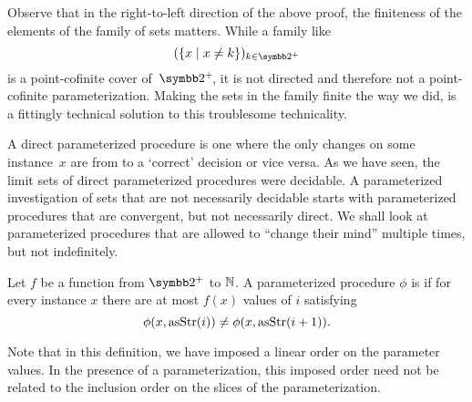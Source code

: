 Observe that in the right-to-left direction of the above proof, the finiteness of the elements of the family of sets matters.
While a family like
\begin{equation*}
  (\{x \st x \neq k\})_{k \in \binary^+}
\end{equation*}
is a point-cofinite cover of~$\binary^+\!$, it is not directed and therefore not a point-cofinite parameterization.
Making the sets in the family finite the way we did, is a fittingly technical solution to this troublesome technicality.

A direct parameterized procedure is one where the only changes on some instance~$x$ are from  to a `correct' decision or vice versa.
As we have seen, the limit sets of direct parameterized procedures were decidable.
A parameterized investigation of sets that are not necessarily decidable starts with parameterized procedures that are convergent, but not necessarily direct.
We shall look at parameterized procedures that are allowed to \enquote{change their mind} multiple times, but not indefinitely.
\begin{definition}
  Let $f$ be a function from $\binary^+$ to $\mathbb{N}$.
  A parameterized procedure $\phi$ is  if for every instance $x$ there are at most $f(x)$ values of $i$ satisfying
  \begin{equation*}
    \phi(x, \operatorname{asStr}(i)) \neq \phi(x, \operatorname{asStr}(i + 1)).
  \end{equation*}
\end{definition}

Note that in this definition, we have imposed a linear order on the parameter values.
In the presence of a parameterization, this imposed order need not be related to the inclusion order on the slices of the parameterization.

